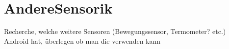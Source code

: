 \section{AndereSensorik}\label{sensorik}

{\color{red}Recherche, welche weitere Sensoren (Bewegungssensor, Termometer? etc.) Android hat, überlegen ob man die verwenden kann}